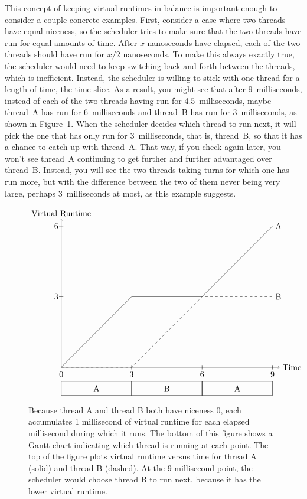 This concept of keeping virtual runtimes in balance is important enough
to consider a couple concrete examples.
First, consider a case where two threads have equal niceness, so the scheduler tries to make
sure that the two threads have run for equal amounts of time. After $x$
nanoseconds have elapsed, each of the two threads should have run for $x/2$
nanoseconds.  To make this always exactly true, the scheduler would need to
keep switching back and forth between the threads, which is inefficient.  Instead, the scheduler is willing to stick with one thread for a length of
time, the time slice.  As a result, you might see that after 9~milliseconds,
instead of each of the two threads having run for 4.5~milliseconds, maybe
thread~A has run for 6~milliseconds and thread~B has run for 3~milliseconds,
as shown in Figure~\ref{equal-virtual-runtime-figure}.  When the scheduler decides which thread to run next, it
will pick the one that has only run for 3~milliseconds, that is, thread~B,
so that it has a chance to catch up with thread~A.  That way, if you check
again later, you won't see thread~A continuing to get further and further
advantaged over thread~B.  Instead, you will see the two threads taking
turns for which one has run more, but with the difference between the two of
them never being very large, perhaps 3~milliseconds at most, as this
example suggests.
\begin{figure}
\[\begin{tikzpicture}[scale=.03]
\draw (0,0) rectangle (100,20);
\draw (100,0) rectangle (200,20);
\draw (200,0) rectangle (300,20);
\draw (50,10) node{A};
\draw (150,10) node{B};
\draw (250,10) node{A};
\draw (0,30) node{0};
\draw (100,30) node{3};
\draw (100,37) -- (100,43);
\draw (200,30) node{6};
\draw (200,37) -- (200,43);
\draw (300,30) node{9};
\draw (300,37) -- (300,43);
\draw[->] (0,40) -- (310,40) node[right] {Time};
\draw[->] (0,40) -- (0,250) node[above] {Virtual Runtime};
\draw (0,40) -- (100,140) -- (200,140) -- (300, 240) node[right] {A};
\draw[dashed] (0,40) -- (100,40) -- (200,140) -- (300, 140) node[right] {B};
\draw (-7,140) node{3};
\draw (-3,140) -- (3,140);
\draw (-7,240) node{6};
\draw (-3,240) -- (3,240);
\end{tikzpicture}\]
\caption{Because thread A and thread B both have niceness 0, each accumulates 1 millisecond of virtual
runtime for each elapsed millisecond during which it runs.  The bottom of this figure shows a Gantt
chart indicating which thread is running at each point.  The top of the figure plots virtual runtime versus time
for thread A (solid) and thread B (dashed). At the 9 millisecond point, the scheduler would choose
thread B to run next, because it has the lower virtual runtime.}\label{equal-virtual-runtime-figure}
\end{figure}


